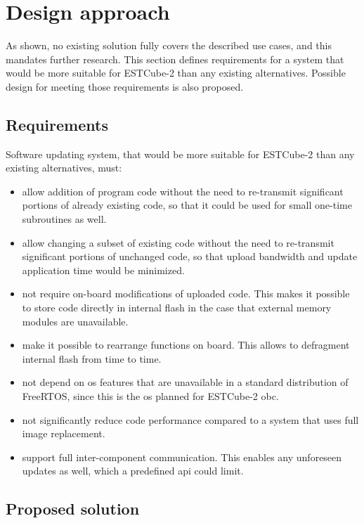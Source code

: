 \newpage
\section{Design approach}
\label{s:design}

As shown, no existing solution fully covers the described use cases, and this mandates further research. This section defines requirements for a system that would be more suitable for ESTCube-2 than any existing alternatives. Possible design for meeting those requirements is also proposed.

\subsection{Requirements}

Software updating system, that would be more suitable for ESTCube-2 than any existing alternatives, must:

\begin{itemize}
	\item allow addition of program code without the need to re-transmit significant portions of already existing code, so that it could be used for small one-time subroutines as well.
	\item allow changing a subset of existing code without the need to re-transmit significant portions of unchanged code, so that upload bandwidth and update application time would be minimized.
	\item not require on-board modifications of uploaded code. This makes it possible to store code directly in internal flash in the case that external memory modules are unavailable.
	\item make it possible to rearrange functions on board. This allows to defragment internal flash from time to time.
	\item not depend on \gls{os} features that are unavailable in a standard distribution of Free\-RTOS, since this is the \gls{os} planned for ESTCube-2 \gls{obc}.
	\item not significantly reduce code performance compared to a system that uses full image replacement.
	\item support full inter-component communication. This enables any unforeseen updates as well, which a predefined \gls{api} could limit.
\end{itemize}

\subsection{Proposed solution}


